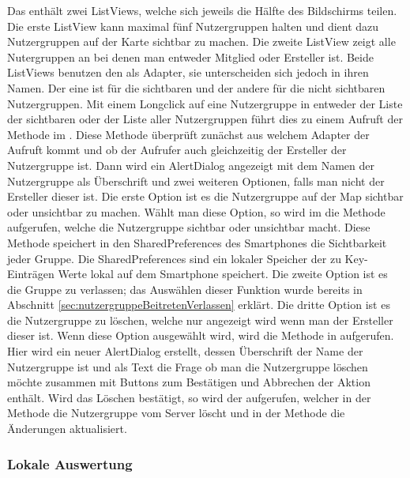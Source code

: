 Das  enthält zwei ListViews, welche sich jeweils die Hälfte des Bildschirms teilen. Die erste ListView kann maximal fünf Nutzergruppen halten und dient dazu Nutzergruppen auf der Karte sichtbar zu machen. Die zweite ListView zeigt alle Nutergruppen an bei denen man entweder Mitglied oder Ersteller ist. Beide ListViews benutzen den  als Adapter, sie unterscheiden sich jedoch in ihren Namen. Der eine ist für die sichtbaren und der andere für die nicht sichtbaren Nutzergruppen. Mit einem Longclick auf eine Nutzergruppe in entweder der Liste der sichtbaren oder der Liste aller Nutzergruppen führt dies zu einem Aufruft der  Methode im . Diese Methode überprüft zunächst aus welchem Adapter der Aufruft kommt und ob der Aufrufer auch gleichzeitig der Ersteller der Nutzergruppe ist. Dann wird ein AlertDialog angezeigt mit dem Namen der Nutzergruppe als Überschrift und zwei weiteren Optionen, falls man nicht der Ersteller dieser ist. Die erste Option ist es die Nutzergruppe auf der Map sichtbar oder unsichtbar zu machen. Wählt man diese Option, so wird im  die  Methode aufgerufen, welche die Nutzergruppe sichtbar oder unsichtbar macht. Diese Methode speichert in den SharedPreferences des Smartphones die Sichtbarkeit jeder Gruppe. Die SharedPreferences sind ein lokaler Speicher der zu Key-Einträgen Werte lokal auf dem Smartphone speichert. Die zweite Option ist es die Gruppe zu verlassen; das Auswählen dieser Funktion wurde bereits in Abschnitt \ref{sec:nutzergruppeBeitretenVerlassen} erklärt. Die dritte Option ist es die Nutzergruppe zu löschen, welche nur angezeigt wird wenn man der Ersteller dieser ist. Wenn diese Option ausgewählt wird, wird die  Methode in  aufgerufen. Hier wird ein neuer AlertDialog erstellt, dessen Überschrift der Name der Nutzergruppe ist und als Text die Frage ob man die Nutzergruppe löschen möchte zusammen mit Buttons zum Bestätigen und Abbrechen der Aktion enthält. Wird das Löschen bestätigt, so wird der  aufgerufen, welcher in der  Methode die Nutzergruppe vom Server löscht und in der  Methode die Änderungen aktualisiert. 
\FloatBarrier


\subsubsection{Lokale Auswertung}
\label{sec:lokaleAuswertung}

